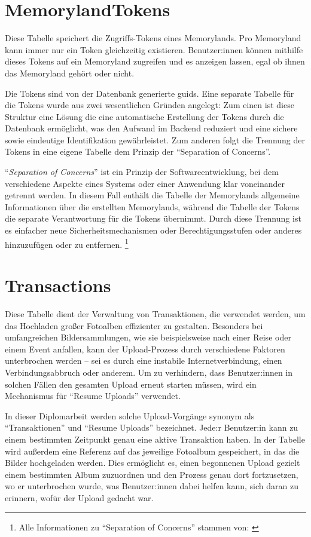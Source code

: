 \section{MemorylandTokens}

Diese Tabelle speichert die Zugriffs-Tokens eines Memorylands. Pro Memoryland kann immer nur 
ein Token gleichzeitig existieren. Benutzer:innen können mithilfe dieses Tokens auf ein 
Memoryland zugreifen und es anzeigen lassen, egal ob ihnen das Memoryland gehört oder nicht.

Die Tokens sind von der Datenbank generierte \gls{guid}s. Eine separate Tabelle für die 
Tokens wurde aus zwei wesentlichen Gründen angelegt: Zum einen ist diese Struktur eine Lösung
die eine automatische Erstellung der Tokens durch die Datenbank ermöglicht, was den 
Aufwand im Backend reduziert und eine sichere sowie eindeutige Identifikation gewährleistet. 
Zum anderen folgt die Trennung der Tokens in eine eigene Tabelle dem Prinzip der 
``Separation of Concerns''.

``\emph{Separation of Concerns}'' ist ein Prinzip der Softwareentwicklung, bei dem 
verschiedene Aspekte eines Systems oder einer Anwendung klar voneinander getrennt werden. 
In diesem Fall enthält die Tabelle der Memorylands allgemeine Informationen über die 
erstellten Memorylands, während die Tabelle der Tokens die separate Verantwortung 
für die Tokens übernimmt. Durch diese Trennung ist es einfacher neue Sicherheitsmechanismen 
oder Berechtigungsstufen oder anderes hinzuzufügen oder zu entfernen.
\footnote{Alle Informationen zu ``Separation of Concerns'' stammen von: \cite{kulkarni2003separation}}

\section{Transactions}

Diese Tabelle dient der Verwaltung von Transaktionen, die verwendet werden, um das Hochladen 
großer Fotoalben effizienter zu gestalten. Besonders bei umfangreichen Bildersammlungen, 
wie sie beispielsweise nach einer Reise oder einem Event anfallen, kann der Upload-Prozess 
durch verschiedene Faktoren unterbrochen werden -- sei es durch eine instabile 
Internetverbindung, einen Verbindungsabbruch oder anderem. Um zu verhindern, dass 
Benutzer:innen in solchen Fällen den gesamten Upload erneut starten müssen, wird ein 
Mechanismus für ``Resume Uploads'' verwendet.

In dieser Diplomarbeit werden solche Upload-Vorgänge synonym als ``Transaktionen'' und 
``Resume Uploads'' bezeichnet. Jede:r Benutzer:in kann zu einem bestimmten Zeitpunkt 
genau eine aktive Transaktion haben. In der Tabelle wird außerdem eine Referenz auf 
das jeweilige Fotoalbum gespeichert, in das die Bilder hochgeladen werden. 
Dies ermöglicht es, einen begonnenen Upload gezielt einem bestimmten Album zuzuordnen 
und den Prozess genau dort fortzusetzen, wo er unterbrochen wurde, was Benutzer:innen
dabei helfen kann, sich daran zu erinnern, wofür der Upload gedacht war.

